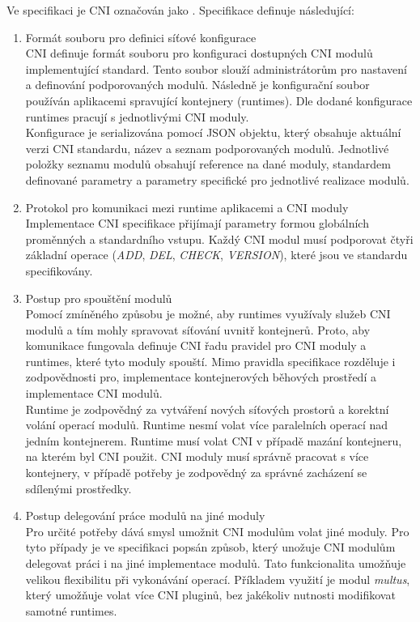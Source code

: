 Ve specifikaci je CNI označován jako  \cite{thekubernetesauthors_2023_container}. Specifikace definuje následující:
\begin{enumerate}
    \item Formát souboru pro definici síťové konfigurace\\
    CNI definuje formát souboru pro konfiguraci dostupných CNI modulů implementující standard. Tento soubor slouží administrátorům pro nastavení a definování podporovaných modulů. Následně je konfigurační soubor používán aplikacemi spravující kontejnery (runtimes). Dle dodané konfigurace runtimes pracují s jednotlivými CNI moduly.\\
    Konfigurace je serializována pomocí JSON objektu, který obsahuje aktuální verzi CNI standardu, název a seznam podporovaných modulů. Jednotlivé položky seznamu modulů obsahují reference na dané moduly, standardem definované parametry a parametry specifické pro jednotlivé realizace modulů.
    \item Protokol pro komunikaci mezi runtime aplikacemi a CNI moduly\\
    Implementace CNI specifikace přijímají parametry formou globálních proměnných a standardního vstupu. Každý CNI modul musí podporovat čtyři základní operace (\textit{ADD}, \textit{DEL}, \textit{CHECK}, \textit{VERSION}), které jsou ve standardu specifikovány.
    \item Postup pro spouštění modulů\\
    Pomocí zmíněného způsobu je možné, aby runtimes využívaly služeb CNI modulů a tím mohly spravovat síťování uvnitř kontejnerů. Proto, aby komunikace fungovala definuje CNI řadu pravidel pro CNI moduly a runtimes, které tyto moduly spouští. Mimo pravidla specifikace rozděluje i zodpovědnosti pro, implementace kontejnerových běhových prostředí a implementace CNI modulů.\\
    Runtime je zodpovědný za vytváření nových síťových prostorů a korektní volání operací modulů. Runtime nesmí volat více paralelních operací nad jedním kontejnerem. Runtime musí volat CNI v případě mazání kontejneru, na kterém byl CNI použit.
    CNI moduly musí správně pracovat s více kontejnery, v případě potřeby je zodpovědný za správné zacházení se sdílenými prostředky. 
    \item Postup delegování práce modulů na jiné moduly\label{enumerate:cni}\\
    Pro určité potřeby dává smysl umožnit CNI modulům volat jiné moduly. Pro tyto případy je ve specifikaci popsán způsob, který unožuje CNI modulům delegovat práci i na jiné implementace modulů. Tato funkcionalita umožňuje velikou flexibilitu při vykonávání operací. Příkladem využití je modul \textit{multus}, který umožňuje volat více CNI pluginů, bez jakékoliv nutnosti modifikovat samotné runtimes.\\

\end{enumerate}

